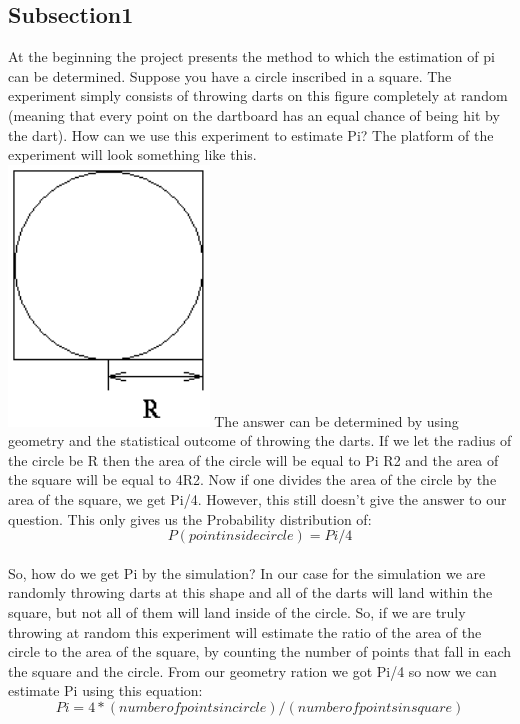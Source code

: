\documentclass{llncs}
\begin{document}
\subsection{Subsection1}At the beginning the project presents the method to which the estimation of pi can be determined. Suppose you have a circle inscribed in a square. The experiment simply consists of throwing darts on this figure completely at random (meaning that every point on the dartboard has an equal chance of being hit by the dart). How can we use this experiment to estimate Pi? The platform of the experiment will look something like this.\\
\includegraphics[width=0.4\textwidth, center]{squarecircle}
The answer can be determined by using geometry and the statistical outcome of throwing the darts. If we let the radius of the circle be R then the area of the circle will be equal to Pi R2 and the area of the square will be equal to 4R2. Now if one divides the area of the circle by the area of the square, we get Pi/4. However, this still doesn’t give the answer to our question. This only gives us the Probability distribution of:
\begin{equation}
P (point inside circle) = Pi/4 
\end{equation}
\\
So, how do we get Pi by the simulation?  In our case for the simulation we are randomly throwing darts at this shape and all of the darts will land within the square, but not all of them will land inside of the circle. So, if we are truly throwing at random this experiment will estimate the ratio of the area of the circle to the area of the square, by counting the number of points that fall in each the square and the circle. From our geometry ration we got Pi/4 so now we can estimate Pi using this equation:
\begin{equation}
Pi = 4 * (number of points in circle) / (number of points in square)
\end{equation}
\end{document}
